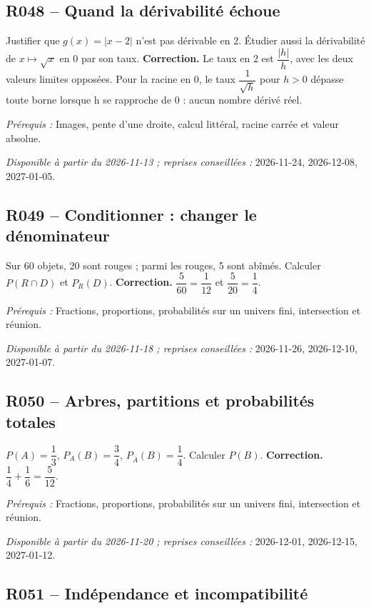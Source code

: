\subsection*{R048 -- Quand la dérivabilité échoue}\label{R048}
Justifier que $g(x)=|x-2|$ n’est pas dérivable en 2. Étudier aussi la dérivabilité de $x\mapsto\sqrt{x}$ en 0 par son taux.
\ifprof\textbf{Correction.} Le taux en 2 est $\dfrac{|h|}{h}$, avec les deux valeurs limites opposées. Pour la racine en 0, le taux $\dfrac{1}{\sqrt h}$ pour $h>0$ dépasse toute borne lorsque h se rapproche de 0 : aucun nombre dérivé réel.\par\textit{Prérequis :} Images, pente d’une droite, calcul littéral, racine carrée et valeur absolue.\par\textit{Disponible à partir du 2026-11-13 ; reprises conseillées :} 2026-11-24, 2026-12-08, 2027-01-05.\fi
{}\subsection*{R049 -- Conditionner : changer le dénominateur}\label{R049}
Sur 60 objets, 20 sont rouges ; parmi les rouges, 5 sont abîmés. Calculer $P(R\cap D)$ et $P_R(D)$.
\ifprof\textbf{Correction.} $\dfrac{5}{60}=\dfrac{1}{12}$ et $\dfrac{5}{20}=\dfrac{1}{4}$.\par\textit{Prérequis :} Fractions, proportions, probabilités sur un univers fini, intersection et réunion.\par\textit{Disponible à partir du 2026-11-18 ; reprises conseillées :} 2026-11-26, 2026-12-10, 2027-01-07.\fi
{}\subsection*{R050 -- Arbres, partitions et probabilités totales}\label{R050}
$P(A)=\dfrac{1}{3}$, $P_A(B)=\dfrac{3}{4}$, $P_{\overline A}(B)=\dfrac{1}{4}$. Calculer $P(B)$.
\ifprof\textbf{Correction.} $\dfrac{1}{4}+\dfrac{1}{6}=\dfrac{5}{12}$.\par\textit{Prérequis :} Fractions, proportions, probabilités sur un univers fini, intersection et réunion.\par\textit{Disponible à partir du 2026-11-20 ; reprises conseillées :} 2026-12-01, 2026-12-15, 2027-01-12.\fi
{}\subsection*{R051 -- Indépendance et incompatibilité}\label{R051}
